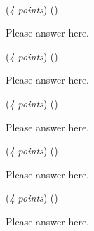\documentclass{template}
\begin{document}
\begin{problem}
~\newline
~\newline


\begin{subproblem}
(\textit{4 points}) (\scoretextemoji{})


\end{subproblem}

\begin{solution}
Please answer here.
\end{solution}

\begin{subproblem}
(\textit{4 points}) (\scoretextemoji{})


\end{subproblem}

\begin{solution}
Please answer here.
\end{solution}

\begin{subproblem}
(\textit{4 points}) (\scoretextemoji{})


\end{subproblem}

\begin{solution}
Please answer here.
\end{solution}

\begin{subproblem}
(\textit{4 points}) (\scoretextemoji{})


\end{subproblem}

\begin{solution}
Please answer here.
\end{solution}

\begin{subproblem}
(\textit{4 points}) (\scoretextemoji{}\scorecodeemoji{})


\end{subproblem}

\begin{solution}
Please answer here.
\end{solution}
\end{problem}

\newpage
\end{document}
